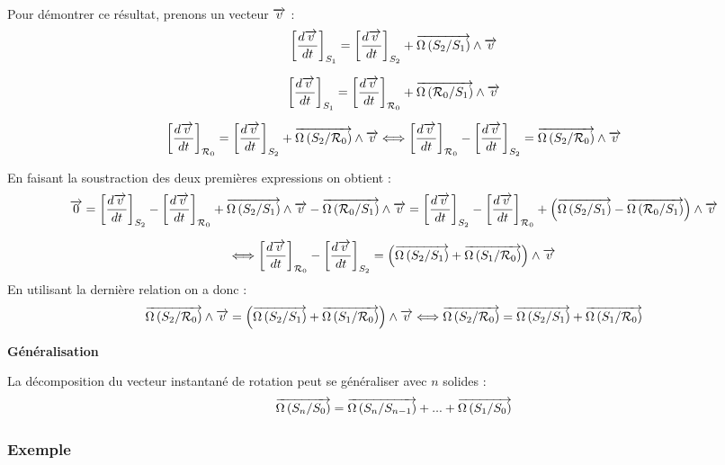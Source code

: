 \documentclass[10pt,oneside]{article}
\begin{document}
Pour démontrer ce résultat, prenons un vecteur $\overrightarrow{v}$ :
$$
\left[\dfrac{d\overrightarrow{v}}{dt}\right]_{S_1} = 
\left[\dfrac{d\overrightarrow{v}}{dt}\right]_{S_2} 
+ \overrightarrow{\Omega\left( {S_2}/{S_1}\right)} \wedge \overrightarrow{v}
$$

$$
\left[\dfrac{d\overrightarrow{v}}{dt}\right]_{S_1} = 
\left[\dfrac{d\overrightarrow{v}}{dt}\right]_{\mathcal{R}_0} 
+ \overrightarrow{\Omega\left( {\mathcal{R}_0}/{S_1}\right)} \wedge \overrightarrow{v}
$$

$$
\left[\dfrac{d\overrightarrow{v}}{dt}\right]_{\mathcal{R}_0} = 
\left[\dfrac{d\overrightarrow{v}}{dt}\right]_{S_2} 
+ \overrightarrow{\Omega\left( {S_2}/{\mathcal{R}_0}\right)} \wedge \overrightarrow{v} \Longleftrightarrow 
\left[\dfrac{d\overrightarrow{v}}{dt}\right]_{\mathcal{R}_0} 
-\left[\dfrac{d\overrightarrow{v}}{dt}\right]_{S_2} 
= \overrightarrow{\Omega\left( {S_2}/{\mathcal{R}_0}\right)} \wedge \overrightarrow{v}
$$

En faisant la soustraction des deux premières expressions on obtient : 
$$
\overrightarrow{0} = 
\left[\dfrac{d\overrightarrow{v}}{dt}\right]_{S_2} 
-\left[\dfrac{d\overrightarrow{v}}{dt}\right]_{\mathcal{R}_0} 
+ \overrightarrow{\Omega\left( {S_2}/{S_1}\right)} \wedge \overrightarrow{v}
- \overrightarrow{\Omega\left( {\mathcal{R}_0}/{S_1}\right)} \wedge \overrightarrow{v}
=\left[\dfrac{d\overrightarrow{v}}{dt}\right]_{S_2} 
-\left[\dfrac{d\overrightarrow{v}}{dt}\right]_{\mathcal{R}_0} 
+ \left(\overrightarrow{\Omega\left( {S_2}/{S_1}\right)} - \overrightarrow{\Omega\left( {\mathcal{R}_0}/{S_1}\right)}  \right)\wedge \overrightarrow{v}
$$

$$
\Longleftrightarrow
\left[\dfrac{d\overrightarrow{v}}{dt}\right]_{\mathcal{R}_0} 
-\left[\dfrac{d\overrightarrow{v}}{dt}\right]_{S_2} 
=
 \left(\overrightarrow{\Omega\left( {S_2}/{S_1}\right)} + \overrightarrow{\Omega\left( {S_1}/{\mathcal{R}_0}\right)}  \right)\wedge \overrightarrow{v}
$$
En utilisant la dernière relation on a donc : 
$$
\overrightarrow{\Omega\left( {S_2}/{\mathcal{R}_0}\right)} \wedge \overrightarrow{v}
=
 \left(\overrightarrow{\Omega\left( {S_2}/{S_1}\right)} + \overrightarrow{\Omega\left( {S_1}/{\mathcal{R}_0}\right)}  \right)\wedge \overrightarrow{v}
\Longleftrightarrow
\overrightarrow{\Omega\left( {S_2}/{\mathcal{R}_0}\right)} = \overrightarrow{\Omega\left( {S_2}/{S_1}\right)} + \overrightarrow{\Omega\left( {S_1}/{\mathcal{R}_0}\right)}
$$
\begin{resultat}
\textbf{Généralisation}

La décomposition du vecteur instantané de rotation peut se généraliser avec $n$ solides : 
$$
\overrightarrow{\Omega\left( {S_n}/{S_0}\right)}
=
\overrightarrow{\Omega\left( {S_n}/{S_{n-1}}\right)}
+...+
\overrightarrow{\Omega\left( {S_1}/{S_0}\right)}
$$
\end{resultat}

\subsubsection{Exemple}
\end{document}
